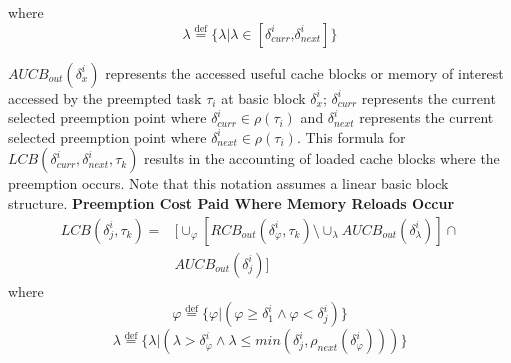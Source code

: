 \noindent
where
\begin{equation*}\label{eqn:lcb-formula-1b}
    \lambda \stackrel{\text{def}}{=} \{ \lambda|\lambda \in [ \delta_{curr}^{i} \text{,} \delta_{next}^{i} ] \}
\end{equation*}

\noindent
\begin{math}\textit{AUCB}_{out}(\delta_{x}^{i})\end{math} represents the accessed useful cache blocks or memory of interest accessed by the preempted task \begin{math}\tau_{i}\end{math} at basic block \begin{math}\delta_{x}^{i}\end{math}; \begin{math}\delta_{curr}^{i}\end{math} represents the current selected preemption point where \begin{math}\delta_{curr}^{i} \in \rho(\tau_{i})\end{math} and \begin{math}\delta_{next}^{i}\end{math} represents the current selected preemption point where \begin{math}\delta_{next}^{i} \in \rho(\tau_{i})\end{math}.  This formula for \begin{math}\textit{LCB}(\delta_{curr}^{i},\delta_{next}^{i},\tau_{k})\end{math} results in the accounting of loaded cache blocks where the preemption occurs.  Note that this notation assumes a linear basic block structure.
\newline
\newline
\noindent\textbf{Preemption Cost Paid Where Memory Reloads Occur}
\begin{equation}\label{eqn:lcb-formula-2}
\begin{split}
    \textit{LCB}(\delta_{j}^{i},\tau_{k}) = &[\cup_\varphi [\textit{RCB}_{out}(\delta_{\varphi}^{i},\tau_{k}) \setminus \cup_\lambda \textit{AUCB}_{out}(\delta_{\lambda}^{i})] \cap \\
    &\textit{AUCB}_{out}(\delta_{j}^{i})]
\end{split}
\end{equation}
\noindent
where
\begin{equation*}\label{eqn:lcb-formula-2b}
\varphi \stackrel{\text{def}}{=} \{\varphi | (\varphi \geq \delta_{1}^{i} \wedge \varphi < \delta_{j}^{i})\}
\end{equation*}
\begin{equation*}\label{eqn:lcb-formula-2c}
    \lambda \stackrel{\text{def}}{=} \{\lambda | (\lambda > \delta_{\varphi}^{i} \wedge \lambda \leq min(\delta_{j}^{i},\rho_{next}(\delta_{\varphi}^{i})))\}
\end{equation*}

